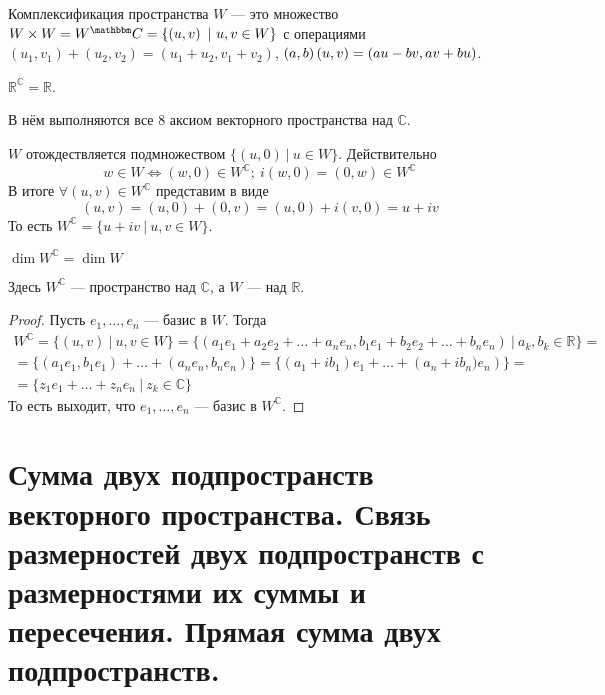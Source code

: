 \begin{Def}
Комплексификация пространства $W$ --- это множество $W\times W = W^\mathbb{C} \hm{=} \{\left( u, v\right)\ |\ u,v \in W\}$ с операциями $\left(u_1, v_1\right) + \left(u_2, v_2\right) = \left(u_1+u_2, v_1+v_2\right)$, $\left(a, b\right)\left(u, v\right) \hm{=} \left(au-bv, av+bu\right)$.
\end{Def}
\begin{Examples}
$\mathbb{R}^\mathbb{C} = \mathbb{R}$.
\end{Examples}

\begin{Statement}
В нём выполняются все 8 аксиом векторного пространства над $\mathbb{C}$.
\end{Statement}
$W$ отождествляется подмножеством $\{\left(u, 0\right)\ |\ u\in W\}$. Действительно
\[
w\in W\Leftrightarrow \left(w,0\right) \in W^\mathbb{C};\ i\left(w,0\right) = \left(0, w\right) \in W^\mathbb{C}
\]
В итоге $\forall \left(u, v\right) \in W^\mathbb{C}$ представим в виде 
\[
\left(u,v\right) = \left(u,0\right) + \left(0,v\right) = \left(u,0\right) + i\left(v,0\right) = u+iv
\]
То есть $W^\mathbb{C} = \{u+iv\ |\ u,v\in W\}$. 
\begin{Suggestion}
$\dim W^\mathbb{C} = \dim W$
\end{Suggestion}
\begin{Comment}
Здесь $W^\mathbb{C}$ --- пространство над $\mathbb{C}$, а $W$ --- над $\mathbb{R}$.
\end{Comment}
\begin{proof}
Пусть $e_1, \ldots, e_n$ --- базис в $W$. Тогда 
\begin{gather*}
W^\mathbb{C} = \{\left(u,v\right)\ |\ u,v \in W\} = \{\left(a_1e_1 + a_2e_2 + \ldots + a_ne_n, b_1e_1 + b_2e_2 + \ldots + b_ne_n\right)\ |\ a_k,b_k \in \mathbb{R}\} = \\
= \{\left(a_1e_1,b_1e_1\right) + \ldots + \left(a_ne_n, b_ne_n\right)\} = \{\left(a_1+ib_1\right)e_1 + \ldots +\left(a_n + ib_n)e_n\right)\} = \\
= \{z_1e_1 + \ldots + z_ne_n\ |\ z_k \in \mathbb{C} \}
\end{gather*}
То есть выходит, что $e_1, \ldots, e_n$ --- базис в $W^\mathbb{C}$.
\end{proof}

\section{Сумма двух подпространств векторного пространства. Связь размерностей двух подпространств с размерностями их суммы и пересечения. Прямая сумма двух подпространств.}


